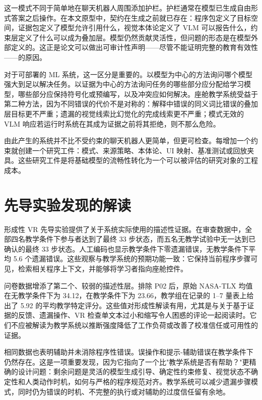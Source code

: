 这一模式不同于简单地在聊天机器人周围添加护栏。护栏通常在模型已生成自由形式答案之后操作。在本文原型中，契约在生成之前就已存在：程序包定义了目标空间，证据包定义了模型允许引用什么，视觉本体论定义了 VLM 可以报告什么，约束层定义了什么可以成为叠加层。模型仍然贡献灵活性，但问题的形态是在模型外部定义的。这正是论文可以做出可审计性声明——尽管不能证明完整的教育有效性——的原因。

对于可部署的 ML 系统，这一区分是重要的。以模型为中心的方法询问哪个模型强大到足以解决任务。以证据为中心的方法询问任务的哪些部分应分配给学习模型，哪些部分应保持符号化或预编写，以及冲突应如何解决。座舱教学系统受益于第二种方法，因为不同错误的代价不是对称的：解释中错误的同义词比错误的叠加层目标更不严重；遗漏的视觉线索比幻觉化的完成线索更不严重；模式无效的 VLM 响应若运行时系统在其成为证据之前将其拒绝，则不那么危险。

由此产生的系统并不比不受约束的聊天机器人更简单，但更可检查。每增加一个约束就创建一个研究工件：模式、来源策略、本体论、UI 映射、基准测试或回放夹具。这些研究工件是将基础模型的流畅性转化为一个可以被评估的研究对象的工程成本。

\section{先导实验发现的解读}\label{sec:disc-pilot}

形成性 VR 先导实验提供了关于系统实际使用的描述性证据。在审查数据中，全部四名教学条件下参与者达到了最终 33 步状态，而五名无教学试验中无一达到已确认的最终 33 步状态。人工编码也显示教学条件下零遗漏错误，无教学条件下平均 5.6 个遗漏错误。这些观察与教学系统的预期功能一致：它保持当前程序步骤可见，检索相关程序上下文，并能够将学习者指向座舱控件。

问卷数据增添了第二个、较弱的描述性层。排除 P02 后，原始 NASA-TLX 均值在无教学条件下为 34.12，在教学条件下为 23.66，教学组在记录的 1--7 量表上给出了 5.92 的平均教学特定评分。这些值对形成性解读有用，尤其是与关于基于证据的反馈、遗漏操作、VR 检查单文本过小和缩写令人困惑的评论一起阅读时。它们不应被解读为教学系统以推断强度降低了工作负荷或改善了校准信任或可用性的证据。

相同数据也表明辅助并未消除程序性错误。误操作和提示-辅助错误在教学条件下仍然存在。这是一项重要发现，因为它指向了一个比"教学系统是否有帮助？"更精确的设计问题：剩余问题是灵活的模型生成引导、确定性约束修复、视觉状态不确定性和人类动作时机，如何与严格的程序规范对齐。教学系统可以减少遗漏步骤模式，同时仍为错误的时机、不完整的执行或对辅助的过度信任留有余地。


